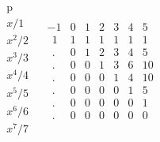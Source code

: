 \documentclass[11pt, oneside]{article}
\begin{document}
\[
\begin{matrix}
\text{p}  \\
x/1  \\
x^2/2 \\
x^3/3 \\
x^4/4 \\
x^5/5 \\
x^6/6 \\
x^7/7
\end{matrix} \ \ \ \
\begin{matrix}
-1 & 0 & 1 & 2 & 3 & 4 & 5  \\
\ \ 1 & 1 & 1 & 1 & 1 & 1 & 1  \\
\ \ . & 0 & 1 & 2 & 3 & 4 & 5 \\
\ \ . & 0 & 0 & 1 & 3 & 6 & 10 \\
\ \ . & 0 & 0 & 0 & 1 & 4 & 10 \\
\ \ . & 0 & 0 & 0 & 0 & 1 & 5 \\
\ \ . & 0 & 0 & 0 & 0 & 0 & 1 \\
\ \ . & 0 & 0 & 0 & 0 & 0 & 0
\end{matrix}
\]
\end{document}
